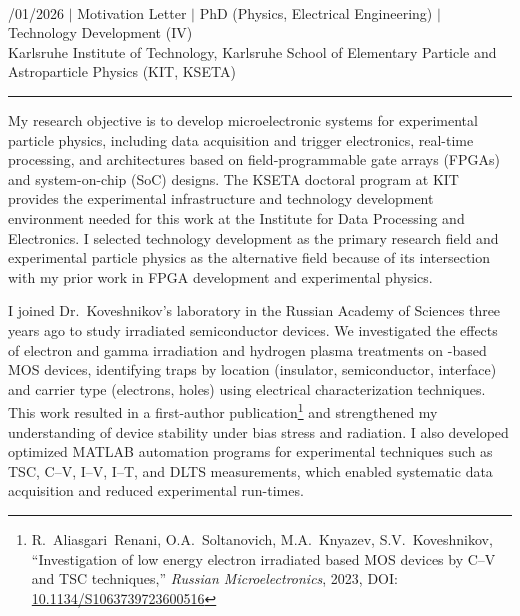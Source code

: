 \documentclass[a4paper,12pt]{article}
\begin{document}
{\centering
  {\scshape {}} \\ 
  {\fontsize{10}{10}/01/2026} $|$
  {\fontsize{10}{10}\selectfont Motivation Letter} $|$
  {\fontsize{10}{10}\selectfont PhD (Physics, Electrical Engineering)} $|$
  {\fontsize{10}{10}\selectfont Technology Development (IV)} \\ 
  {\fontsize{10}{10}\selectfont Karlsruhe Institute of Technology, Karlsruhe
  School of Elementary Particle and Astroparticle Physics (KIT, KSETA)}
\par}
\vspace{-15pt}
\noindent\rule{\textwidth}{0.5pt}

\vspace{-5pt}

My research objective is to develop microelectronic systems for experimental particle physics, including data acquisition and trigger electronics, real-time processing, and architectures based on field-programmable gate arrays (FPGAs) and system-on-chip (SoC) designs. The KSETA doctoral program at KIT provides the experimental infrastructure and technology development environment needed for this work at the Institute for Data Processing and Electronics. I selected technology development as the primary research field and experimental particle physics as the alternative field because of its intersection with my prior work in FPGA development and experimental physics.

I joined Dr.\ Koveshnikov's laboratory in the Russian Academy of Sciences three years ago to study irradiated semiconductor devices. We investigated the effects of electron and gamma irradiation and hydrogen plasma treatments on -based MOS devices, identifying traps by location (insulator, semiconductor, interface) and carrier type (electrons, holes) using electrical characterization techniques. This work resulted in a first-author publication\footnote{R.~Aliasgari~Renani, O.A.~Soltanovich, M.A.~Knyazev, S.V.~Koveshnikov, ``Investigation of low energy electron irradiated  based MOS devices by C--V and TSC techniques,'' \textit{Russian Microelectronics}, 2023, DOI: \href{https://doi.org/10.1134/S1063739723600516}{10.1134/S1063739723600516}} and strengthened my understanding of device stability under bias stress and radiation. I also developed optimized MATLAB automation programs for experimental techniques such as TSC, C--V, I--V, I--T, and DLTS measurements, which enabled systematic data acquisition and reduced experimental run-times.
\end{document}

